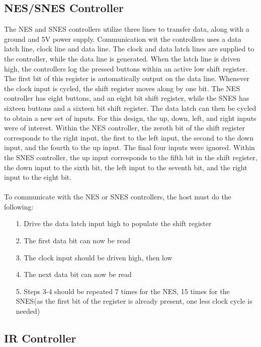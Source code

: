 \documentclass[]{article}
\begin{document}
\subsection{NES/SNES Controller}
The NES and SNES controllers utilize three lines to transfer data, along with a ground and 5V power supply. Communication wit the controllers uses a data latch line, clock line and data line. The clock and data latch lines are supplied to the controller, while the data line is generated. When the latch line is driven high, the controllers log the pressed buttons within an active low shift register. The first bit of this register is automatically output on the data line. Whenever the clock input is cycled, the shift register moves along by one bit. The NES controller has eight buttons, and an eight bit shift register, while the SNES has sixteen buttons and a sixteen bit shift register. The data latch can then be cycled to obtain a new set of inputs. For this design, the up, down, left, and right inputs were of interest. Within the NES controller, the zeroth bit of the shift register corresponds to the right input, the first to  the left input, the second to the down input, and the fourth to the up input. The final four inputs were ignored. Within the SNES controller, the up input corresponds to the fifth bit in the shift register, the down input to the sixth bit, the left input to the seventh bit, and the right input to the eight bit. \\~\\
To communicate with the NES or SNES controllers, the host must do the following:
\begin{itemize}
    \item[1.] Drive the data latch input high to populate the shift register
    \item[2.] The first data bit can now be read
    \item[3.] The clock input should be driven high, then low
    \item[4.] The next data bit can now be read
    \item[5.] Steps 3-4 should be repeated 7 times for the NES, 15 times for the SNES(as the first bit of the register is already present, one less clock cycle is needed)
\end{itemize}

\subsection{IR Controller}
\end{document}
